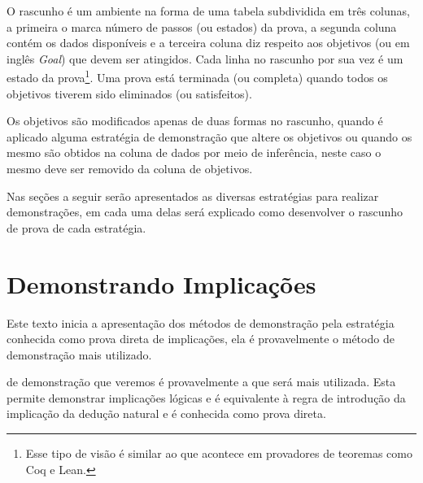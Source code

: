 O rascunho é um ambiente na forma de uma tabela subdividida em três colunas, a primeira o marca número de passos (ou estados) da prova, a segunda coluna contém os dados disponíveis e a terceira coluna diz respeito aos objetivos (ou em inglês \textit{Goal}) que devem ser atingidos. Cada linha no rascunho por sua vez é um estado da prova\footnote{Esse tipo de visão é similar ao que acontece em provadores de teoremas como Coq \cite{coq2013} e Lean.}. Uma prova está terminada (ou completa) quando todos os objetivos tiverem sido eliminados (ou satisfeitos). 

\begin{remark}
	Os objetivos são modificados apenas de duas formas no rascunho, quando é aplicado alguma estratégia de demonstração que altere os objetivos ou quando os mesmo são obtidos na coluna de dados por meio de inferência, neste caso o mesmo deve ser removido da coluna de objetivos.
\end{remark}

Nas seções a seguir serão apresentados as diversas estratégias para realizar demonstrações, em cada uma delas será explicado como desenvolver o rascunho de prova de cada estratégia.

\section{Demonstrando Implicações}\label{sec:ProvandoImplicacao}

Este texto inicia a apresentação dos métodos de demonstração pela estratégia conhecida como prova direta de implicações, ela é provavelmente o método de demonstração mais utilizado.

 de demonstração que veremos é provavelmente a
que será mais utilizada. Esta permite demonstrar implicações lógicas
e é equivalente à regra de introdução da implicação da dedução
natural e é conhecida como prova direta.
